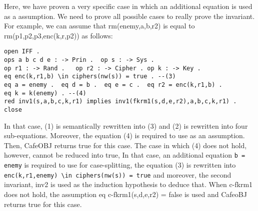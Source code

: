 \documentclass[a4paper,fleqn]{cas-dc}
\begin{document}
Here, we have proven a very specific case in which an additional equation is used as a assumption. We need to prove all possible cases to really prove the invariant. For example, we can assume that rm(enemy,a,b,r2) is equal to rm(p1,p2,p3,enc(k,r,p2)) as follows: 
\begin{small}
\begin{verbatim}
open IFF .
ops a b c d e : -> Prin .  op s : -> Sys .  
op r1 : -> Rand .   op r2 : -> Cipher . op k : -> Key .
eq enc(k,r1,b) \in ciphers(nw(s)) = true . --(3)
eq a = enemy .  eq d = b .  eq e = c .  eq r2 = enc(k,r1,b) .
eq k = k(enemy) . --(4)
red inv1(s,a,b,c,k,r1) implies inv1(fkrm1(s,d,e,r2),a,b,c,k,r1) .
close
\end{verbatim}
\end{small}
In that case, (1) is semantically rewritten into (3) and (2) is rewritten into four sub-equations. Moreover, the equation (4) is required to use as an assumption. Then, CafeOBJ returns true for this case. The case in which (4) does not hold, however, cannot be reduced into true, In that case, an additional equation \verb!b = enemy! is required to use for case-splitting, the equation (3) is rewritten into \verb!enc(k,r1,enemy) \in ciphers(nw(s)) = true! and moreover, the second invariant, inv2 is used as the induction hypothesis to deduce that.
When c-fkrm1 does not hold, the assumption eq c-fkrm1(s,d,e,r2) = false is used and CafeoBJ returns true for this case.
\end{document}
